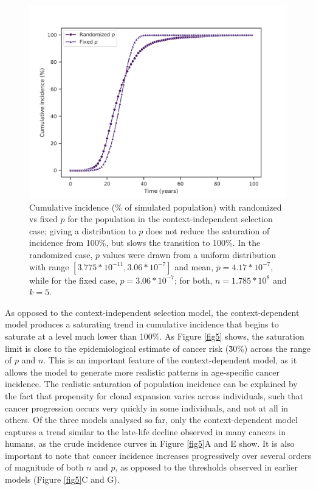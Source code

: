 \documentclass[10pt,twocolumn,twoside]{article}
\begin{document}
\begin{figure}[tbhp]
	\centering
	\includegraphics[width=\linewidth, keepaspectratio=true]{fig4.png}
	\caption{Cumulative incidence (\% of simulated population) with randomized vs fixed $p$ for the population in the context-independent selection case; giving a distribution to $p$ does not reduce the saturation of incidence from 100\%, but slows the transition to 100\%. In the randomized case, $p$ values were drawn from a uniform distribution with range $[3.775*10^{-11}, 3.06*10^{-7}]$ and mean, $\overline{p} = 4.17*10^{-7}$, while for the fixed case, $p=3.06*10^{-7}$; for both, $n=1.785*10^{8}$ and $k=5$.} 
	\label{fig4}
\end{figure}

As opposed to the context-independent selection model, the context-dependent model produces a saturating trend in cumulative incidence that begins to saturate at a level much lower than 100\%. As Figure \ref{fig5} shows, the saturation limit is close to the epidemiological estimate of cancer risk (\~30\%) across the range of $p$ and $n$. This is an important feature of the context-dependent model, as it allows the model to generate more realistic patterns in age-specific cancer incidence. The realistic saturation of population incidence can be explained by the fact that propensity for clonal expansion varies across individuals, such that cancer progression occurs very quickly in some individuals, and not at all in others. Of the three models analysed so far, only the context-dependent model captures a trend similar to the late-life decline observed in many cancers in humans, as the crude incidence curves in Figure \ref{fig5}A and E show. It is also important to note that cancer incidence increases progressively over several orders of magnitude of both $n$ and $p$, as opposed to the thresholds observed in earlier models (Figure \ref{fig5}C and G).
\end{document}
